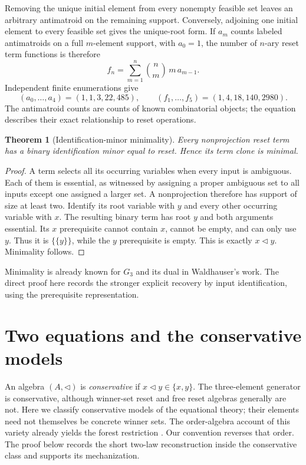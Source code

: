 \documentclass[11pt]{article}
\newtheorem{theorem}{Theorem}[section]
\newcommand{\del}{\mathbin{\triangleleft}}
\begin{document}
Removing the unique initial element from every nonempty feasible set
leaves an arbitrary antimatroid on the remaining support. Conversely,
adjoining one initial element to every feasible set gives the unique-root
form. If $a_m$ counts labeled antimatroids on a full $m$-element support,
with $a_0=1$, the number of $n$-ary reset term functions is therefore
\[
 f_n=\sum_{m=1}^n\binom nm\,m\,a_{m-1}.
\]
Independent finite enumerations give
\[
 (a_0,\ldots,a_4)=(1,1,3,22,485),\qquad
 (f_1,\ldots,f_5)=(1,4,18,140,2980).
\]
The antimatroid counts are counts of known combinatorial objects;
the equation describes their exact relationship to reset operations.

\begin{theorem}[Identification-minor minimality]\label{thm:minimal}
Every nonprojection reset term has a binary identification minor equal
to reset. Hence its term clone is minimal.
\end{theorem}
\begin{proof}
A term selects all its occurring variables when every input is
ambiguous. Each of them is essential, as witnessed by assigning a proper
ambiguous set to all inputs except one assigned a larger set.
A nonprojection therefore has support of size at least two. Identify
its root variable with $y$ and every other occurring variable with $x$.
The resulting binary term has root $y$ and both arguments essential.
Its $x$ prerequisite cannot contain $x$, cannot be empty, and can only
use $y$. Thus it is $\{\{y\}\}$, while the $y$ prerequisite is empty.
This is exactly $x\del y$. Minimality follows.
\end{proof}

Minimality is already known for $G_3$ and its dual in
Waldhauser's work. The direct proof here records the stronger explicit
recovery by input identification, using the prerequisite representation.

\section{Two equations and the conservative models}

An algebra $(A,\del)$ is \emph{conservative} if $x\del y\in\{x,y\}$.
The three-element generator is conservative, although winner-set reset
and free reset algebras generally are not. Here we classify conservative
models of the equational theory; their elements need not themselves be
concrete winner sets.
The order-algebra account of this variety already yields the forest
restriction \cite[Theorem~3.3]{FreeseEtAl2002}. Our convention reverses
that order. The proof below records the short two-law reconstruction
inside the conservative class and supports its mechanization.
\end{document}
